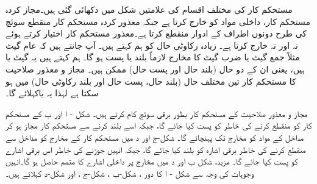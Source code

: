 مستحکم کار کی مختلف اقسام کی علامتیں شکل میں دکھائی گئی ہیں۔مجاز کردہ مستحکم کار، داخلی مواد کو خارج کرتا ہے جبکہ معذور کردہ مستحکم کار منقطع سوئچ کی طرح دونوں اطراف کے ادوار منقطع کرتا ہے۔معذور مستحکم کار  اختیار کرتے ہوئے نہ  اور نہ  خارج کرتا ہے۔  زیادہ رکاوٹی حال کو ہم  کہتے ہیں۔ آپ جانتے ہیں کہ عام گیٹ مثلاً جمع گیٹ یا ضرب گیٹ کا مخارج لازماً بلند یا پست ہو گا۔ ہم کہتے ہیں یہ گیٹ  یا  ہیں، یعنی ان کے دو حال (بلند حال اور پست حال)  ممکن ہیں۔   مجاز و معذور صلاحیت کا مستحکم کار تین مختلف حال (بلند حال، پست حال اور بلند رکاوٹی حال)  میں ہو سکتا ہے لہٰذا یہ   یاکہلائے گا۔


مجاز و معذور صلاحیت کے مستحکم کار بطور برقی سوئچ کام کرتے ہیں۔ شکل - ا اور ب کے مستحکم کار کو منقطع کرنے کی خاطر  کو پست کیا جائے گا، جبکہ اسے بلند کرنے سے مستحکم کار مجاز ہو کر مداخل کے مواد کو مخارج تک پہنچائے گا۔ شکل-ج اور د میں مستحکم کار کے مخارج کو مداخل سے منقطع کرنے کی خاطر  برقی اشارہ کو بلند کیا جائے گا، جبکہ انہیں جوڑنے کی خاطر اس برقی اشارے کو پست کیا جائے گا۔ مزید، شکل ب اور د میں مخارج پر داخلی اشارے کا متمم حاصل ہو گا۔انہیں وجوہات کی وجہ سے شکل - ا کا دور ، شکل-ب ، شکل-ج ، اور شکل-د  کہلاتے ہیں۔
 

